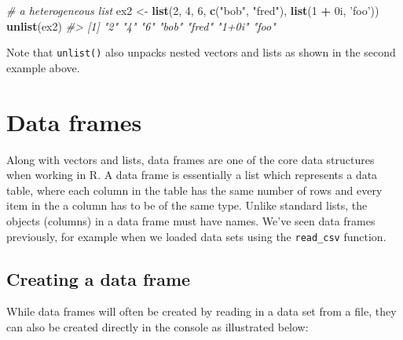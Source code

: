 \documentclass[]{book}
\newenvironment{Shaded}{\begin{snugshade}}{\end{snugshade}}
\newcommand{\CommentTok}[1]{\textcolor[rgb]{0.56,0.35,0.01}{\textit{#1}}}
\newcommand{\DecValTok}[1]{\textcolor[rgb]{0.00,0.00,0.81}{#1}}
\newcommand{\KeywordTok}[1]{\textcolor[rgb]{0.13,0.29,0.53}{\textbf{#1}}}
\newcommand{\NormalTok}[1]{#1}
\newcommand{\OperatorTok}[1]{\textcolor[rgb]{0.81,0.36,0.00}{\textbf{#1}}}
\newcommand{\StringTok}[1]{\textcolor[rgb]{0.31,0.60,0.02}{#1}}
\theoremstyle{definition}
\theoremstyle{definition}
\theoremstyle{definition}
\theoremstyle{remark}
\begin{document}
\begin{Shaded}
\begin{Highlighting}[]
\CommentTok{# a heterogeneous list}
\NormalTok{ex2 <-}\StringTok{ }\KeywordTok{list}\NormalTok{(}\DecValTok{2}\NormalTok{, }\DecValTok{4}\NormalTok{, }\DecValTok{6}\NormalTok{, }\KeywordTok{c}\NormalTok{(}\StringTok{"bob"}\NormalTok{, }\StringTok{"fred"}\NormalTok{), }\KeywordTok{list}\NormalTok{(}\DecValTok{1} \OperatorTok{+}\StringTok{ }\NormalTok{0i, }\StringTok{'foo'}\NormalTok{))}
\KeywordTok{unlist}\NormalTok{(ex2)}
\CommentTok{#> [1] "2"    "4"    "6"    "bob"  "fred" "1+0i" "foo"}
\end{Highlighting}
\end{Shaded}

Note that \texttt{unlist()} also unpacks nested vectors and lists as
shown in the second example above.

\hypertarget{data-frames}{%
\section{Data frames}\label{data-frames}}

Along with vectors and lists, data frames are one of the core data
structures when working in R. A data frame is essentially a list which
represents a data table, where each column in the table has the same
number of rows and every item in the a column has to be of the same
type. Unlike standard lists, the objects (columns) in a data frame must
have names. We've seen data frames previously, for example when we
loaded data sets using the \texttt{read\_csv} function.

\hypertarget{creating-a-data-frame}{%
\subsection{Creating a data frame}\label{creating-a-data-frame}}

While data frames will often be created by reading in a data set from a
file, they can also be created directly in the console as illustrated
below:
\end{document}
